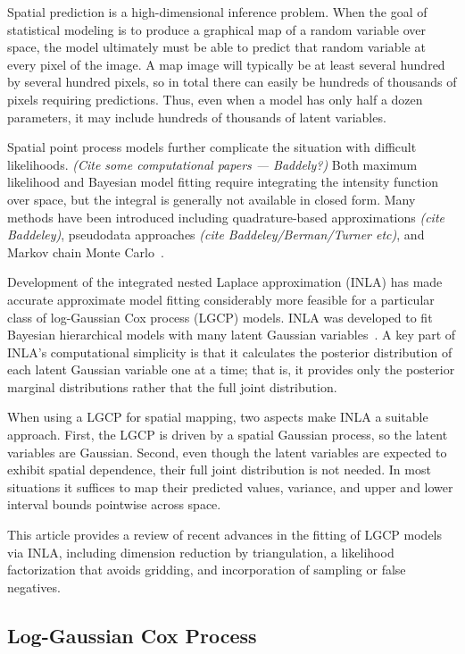 \documentclass[]{interact}
\begin{document}

Spatial prediction is a high-dimensional inference problem. When the goal of
statistical modeling is to produce a graphical map of a random variable over
space, the model ultimately must be able to predict that random variable at
every pixel of the image. A map image will typically be at least several
hundred by several hundred pixels, so in total there can easily be hundreds of
thousands of pixels requiring predictions. Thus, even when a model has only
half a dozen parameters, it may include hundreds of thousands of latent
variables.

Spatial point process models further complicate the situation with difficult
likelihoods. {\it (Cite some computational papers --- Baddely?)} Both maximum
likelihood and Bayesian model fitting require integrating the intensity
function over space, but the integral is generally not available in closed
form. Many methods have been introduced including quadrature-based
approximations {\it (cite Baddeley)}, pseudodata approaches
{\it (cite Baddeley/Berman/Turner etc)}, and Markov chain Monte
Carlo~\cite{moellerwaagepetersen}.

Development of the integrated nested Laplace approximation (INLA) has made
accurate approximate model fitting considerably more feasible for a particular
class of log-Gaussian Cox process (LGCP) models. INLA was developed to fit
Bayesian hierarchical models with many latent Gaussian
variables~\cite{rueetal}. A key part of INLA's computational simplicity is that
it calculates the posterior distribution of each latent Gaussian variable one
at a time; that is, it provides only the posterior marginal distributions
rather that the full joint distribution.

When using a LGCP for spatial mapping, two aspects make INLA a suitable
approach. First, the LGCP is driven by a spatial Gaussian process, so the
latent variables are Gaussian. Second, even though the latent variables are
expected to exhibit spatial dependence, their full joint distribution is not
needed. In most situations it suffices to map their predicted values, variance,
and upper and lower interval bounds pointwise across space.

This article provides a review of recent advances in the fitting of LGCP models
via INLA, including dimension reduction by triangulation, a likelihood
factorization that avoids gridding, and incorporation of sampling or false
negatives.


\subsection{Log-Gaussian Cox Process}
\end{document}
